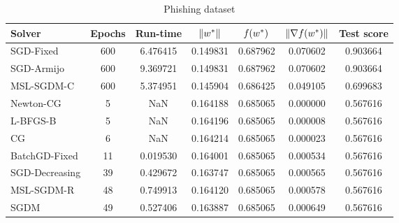 \begin{table}
\caption{Phishing dataset}
\label{tab:phish-tab}
\centering
\begin{tabular}{lS[drop-zero-decimal]S[round-precision=4]S[round-precision=6]S[round-precision=6]S[exponent-mode=scientific]S[round-precision=6]}
\toprule
Solver & {Epochs} & {Run-time} & {$\lVert w^\ast\rVert$} & {$\operatorname*{\mathit{f}}(w^\ast)$} & {$\lVert\nabla f(w^\ast)\rVert$} & {Test score} \\
\midrule
SGD-Fixed & 600 & 6.476415 & 0.149831 & 0.687962 & 0.070602 & 0.903664 \\
SGD-Armijo & 600 & 9.369721 & 0.149831 & 0.687962 & 0.070602 & 0.903664 \\
MSL-SGDM-C & 600 & 5.374951 & 0.145904 & 0.686425 & 0.049105 & 0.699683 \\
Newton-CG & 5 & NaN & 0.164188 & 0.685065 & 0.000000 & 0.567616 \\
L-BFGS-B & 5 & NaN & 0.164196 & 0.685065 & 0.000008 & 0.567616 \\
CG & 6 & NaN & 0.164214 & 0.685065 & 0.000023 & 0.567616 \\
BatchGD-Fixed & 11 & 0.019530 & 0.164001 & 0.685065 & 0.000534 & 0.567616 \\
SGD-Decreasing & 39 & 0.429672 & 0.163747 & 0.685065 & 0.000565 & 0.567616 \\
MSL-SGDM-R & 48 & 0.749913 & 0.164120 & 0.685065 & 0.000578 & 0.567616 \\
SGDM & 49 & 0.527406 & 0.163887 & 0.685065 & 0.000649 & 0.567616 \\
\bottomrule
\end{tabular}
\end{table}


